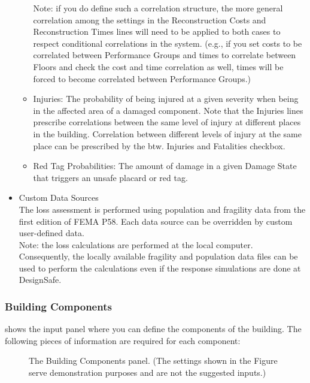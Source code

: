 \begin{itemize}
\begin{itemize}
        Note: if you do define such a correlation structure, the more general correlation among the settings in the Reconstruction Costs and Reconstruction Times lines will need to be applied to both cases to respect conditional correlations in the system. (e.g., if you set costs to be correlated between Performance Groups and times to correlate between Floors and check the cost and time correlation as well, times will be forced to become correlated between Performance Groups.)
        \item Injuries: The probability of being injured at a given severity when being in the affected area of a damaged component. Note that the Injuries lines prescribe correlations between the same level of injury at different places in the building. Correlation between different levels of injury at the same place can be prescribed by the btw. Injuries and Fatalities checkbox.
        \item Red Tag Probabilities: The amount of damage in a given Damage State that triggers an unsafe placard or red tag.
    \end{itemize}
    \item Custom Data Sources\\
    The loss assessment is performed using population and fragility data from the first edition of FEMA P58. Each data source can be overridden by custom user-defined data.\\
    Note: the loss calculations are performed at the local computer. Consequently, the locally available fragility and population data files can be used to perform the calculations even if the response simulations are done at DesignSafe.
\end{itemize}

\subsubsection{Building Components}

 shows the input panel where you can define the components of the building. The following pieces of information are required for each component:

\begin{figure}[!htbp]
  \caption{The Building Components panel. (The settings shown in the Figure serve demonstration purposes and are not the suggested inputs.)}
  \label{fig:dl_p58_comp}
\end{figure}

